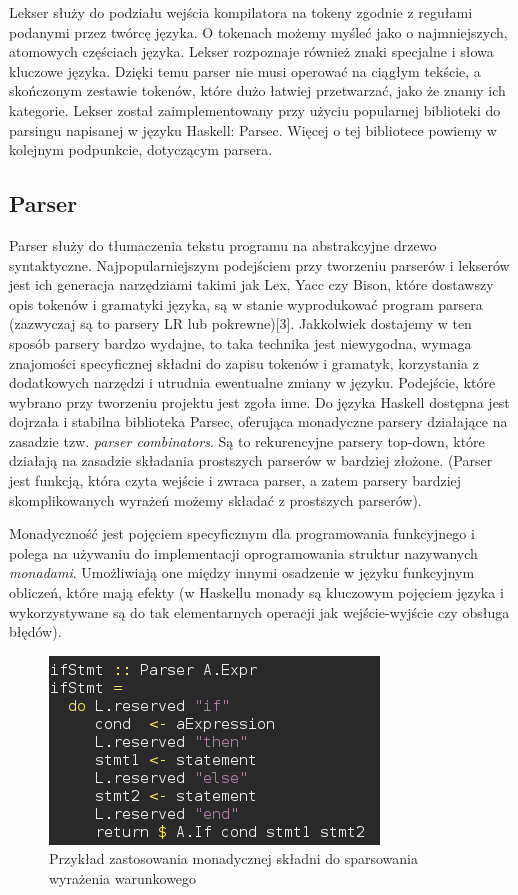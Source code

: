 Lekser służy do podziału wejścia kompilatora na tokeny zgodnie z regułami podanymi przez twórcę języka. O tokenach możemy myśleć jako o najmniejszych, atomowych częściach języka. Lekser rozpoznaje również znaki specjalne i słowa kluczowe języka. Dzięki temu parser nie musi operować na ciągłym tekście, a skończonym zestawie tokenów, które dużo łatwiej przetwarzać, jako że znamy ich kategorie. Lekser został zaimplementowany przy użyciu popularnej biblioteki do parsingu napisanej w języku Haskell: Parsec. Więcej o tej bibliotece powiemy w kolejnym podpunkcie, dotyczącym parsera.

\subsection{Parser}

Parser służy do tłumaczenia tekstu programu na abstrakcyjne drzewo syntaktyczne. Najpopularniejszym podejściem przy tworzeniu parserów i lekserów jest ich generacja narzędziami takimi jak Lex, Yacc czy Bison, które dostawszy opis tokenów i gramatyki języka, są w stanie wyprodukować program parsera (zazwyczaj są to parsery LR lub pokrewne)[3]. Jakkolwiek dostajemy w ten sposób parsery bardzo wydajne, to taka technika jest niewygodna, wymaga znajomości specyficznej składni do zapisu tokenów i gramatyk, korzystania z dodatkowych narzędzi i utrudnia ewentualne zmiany w języku. Podejście, które wybrano przy tworzeniu projektu jest zgoła inne. Do języka Haskell dostępna jest dojrzała i stabilna biblioteka Parsec, oferująca monadyczne parsery działające na zasadzie tzw. \textit{parser combinators}. Są to rekurencyjne parsery top-down, które działają na zasadzie składania prostszych parserów w bardziej złożone. (Parser jest funkcją, która czyta wejście i zwraca parser, a zatem parsery bardziej skomplikowanych wyrażeń możemy składać z prostszych parserów).

Monadyczność jest pojęciem specyficznym dla programowania funkcyjnego i polega na używaniu do implementacji oprogramowania struktur nazywanych \textit{monadami}. Umożliwiają one między innymi osadzenie w języku funkcyjnym obliczeń, które mają efekty (w Haskellu monady są kluczowym pojęciem języka i wykorzystywane są do tak elementarnych operacji jak wejście-wyjście czy obsługa błędów).

\begin{figure}
  \begin{center}
    \includegraphics[scale=0.5]{images/parsing.png}
    \caption{Przykład zastosowania monadycznej składni do sparsowania wyrażenia warunkowego}
    \label{fig:parsing}
  \end{center}
\end{figure}

